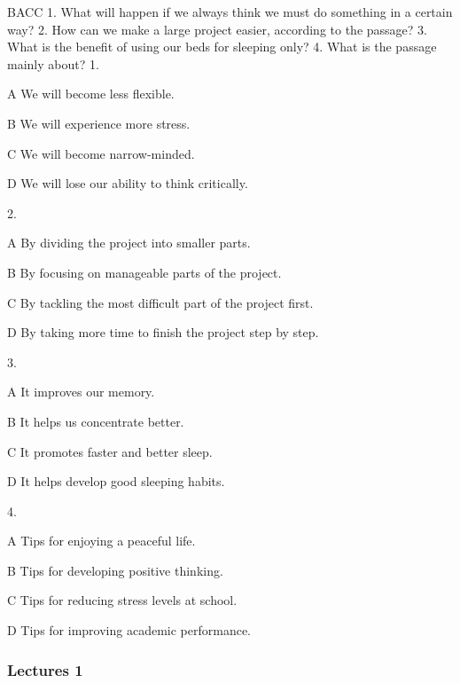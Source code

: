 \begin{enumerate}
	BACC
	1. What will happen if we always think we must do something in a certain way?
	2. How can we make a large project easier, according to the passage?
	3. What is the benefit of using our beds for sleeping only?
	4. What is the passage mainly about?
	1.
	
	A
	We will become less flexible.
	
	B
	We will experience more stress.
	
	C
	We will become narrow-minded.
	
	D
	We will lose our ability to think critically.
	
	2.
	
	A
	By dividing the project into smaller parts.
	
	B
	By focusing on manageable parts of the project.
	
	C
	By tackling the most difficult part of the project first.
	
	D
	By taking more time to finish the project step by step.
	
	3.
	
	A
	It improves our memory.
	
	B
	It helps us concentrate better.
	
	C
	It promotes faster and better sleep.
	
	D
	It helps develop good sleeping habits.
	
	4.
	
	A
	Tips for enjoying a peaceful life.
	
	B
	Tips for developing positive thinking.
	
	C
	Tips for reducing stress levels at school.
	
	D
	Tips for improving academic performance.
\end{enumerate}

\subsubsection{Lectures 1}

